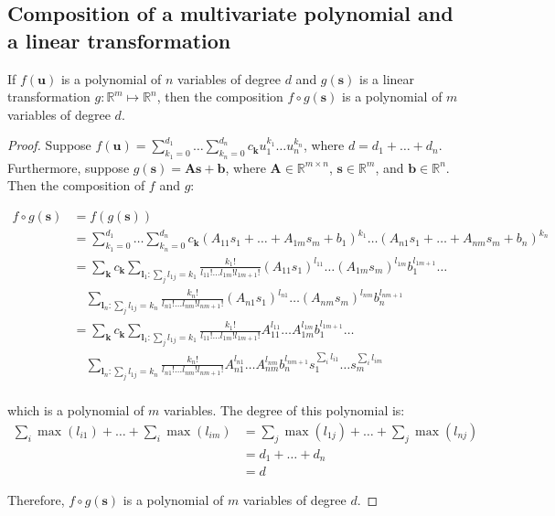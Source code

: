 \documentclass{article}
\begin{document}
\subsection{Composition of a multivariate polynomial and a linear transformation} \label{composition}
If $f(\mathbf{u})$ is a polynomial of $n$ variables of degree $d$ and $g(\mathbf{s})$ is a linear transformation $g: \mathbb{R}^m \mapsto \mathbb{R}^n$, then the composition $f \circ g(\mathbf{s})$ is a polynomial of $m$ variables of degree $d$.

\begin{proof}
Suppose $f(\mathbf{u}) = \sum_{k_1=0}^{d_1} \ldots \sum_{k_n=0}^{d_n} c_{\mathbf{k}} u_1^{k_1} \ldots u_n^{k_n}$, where $d = d_1 + \ldots + d_n$. Furthermore, suppose $g(\mathbf{s}) = \mathbf{As} + \mathbf{b}$, where $\mathbf{A} \in \mathbb{R}^{m \times n}$, $\mathbf{s} \in \mathbb{R}^m$, and $\mathbf{b} \in \mathbb{R}^n$. Then the composition of $f$ and $g$:

\begin{align*}
f \circ g(\mathbf{s}) &= f(g(\mathbf{s})) \\
&= \sum_{k_1=0}^{d_1} \ldots \sum_{k_n=0}^{d_n} c_{\mathbf{k}} (A_{11}s_1 + \ldots + A_{1m}s_m + b_1)^{k_1} \ldots (A_{n1}s_1 + \ldots + A_{nm}s_m + b_n)^{k_n} \\
&= \sum_{\mathbf{k}} c_{\mathbf{k}} \sum_{\mathbf{l}_1: \sum_j l_{1j} = k_1} \frac{k_1!}{l_{11}! \ldots l_{1m}! l_{1m+1}!} (A_{11}s_1)^{l_{11}} \ldots (A_{1m}s_m)^{l_{1m}} b_1^{l_{1m+1}} \ldots \\
& \quad \sum_{\mathbf{l}_n: \sum_j l_{1j} = k_n} \frac{k_n!}{l_{n1}! \ldots l_{nm}! l_{nm+1}!} (A_{n1}s_1)^{l_{n1}} \ldots (A_{nm}s_m)^{l_{nm}} b_n^{l_{nm+1}} \\
&= \sum_{\mathbf{k}} c_{\mathbf{k}} \sum_{\mathbf{l}_1: \sum_j l_{1j} = k_1} \frac{k_1!}{l_{11}! \ldots l_{1m}! l_{1m+1}!} A_{11}^{l_{11}} \ldots A_{1m}^{l_{1m}} b_1^{l_{1m+1}} \ldots \\
& \quad \sum_{\mathbf{l}_n: \sum_j l_{1j} = k_n} \frac{k_n!}{l_{n1}! \ldots l_{nm}! l_{nm+1}!} A_{n1}^{l_{n1}} \ldots A_{nm}^{l_{nm}} b_n^{l_{nm+1}} s_1^{\sum_i l_{i1}} \ldots s_m^{\sum_i l_{im}} \\
\end{align*}

which is a polynomial of $m$ variables. The degree of this polynomial is:
\begin{align*}
\sum_i \max(l_{i1}) + \ldots + \sum_i \max(l_{im})
&= \sum_j \max(l_{1j}) + \ldots + \sum_j \max(l_{nj}) \\
&= d_1 + \ldots + d_n \\
&= d
\end{align*}

Therefore, $f \circ g(\mathbf{s})$ is a polynomial of $m$ variables of degree $d$.

\end{proof}
\end{document}
